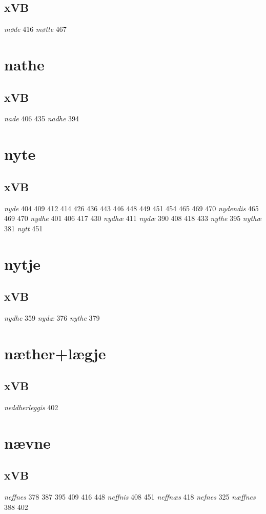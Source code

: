 \documentclass[a4paper,twocolumn]{article}
\begin{document}
\subsection{xVB}
\label{sec:orge35140a}
\emph{møde} 416 \emph{møtte} 467 
\section{nathe}
\label{sec:org85e29d6}
\subsection{xVB}
\label{sec:orga659081}
\emph{nade} 406 435 \emph{nadhe} 394 
\section{nyte}
\label{sec:orgb786a4c}
\subsection{xVB}
\label{sec:org645aca0}
\emph{nyde} 404 409 412 414 426 436 443 446 448 449 451 454 465 469 470 \emph{nydendis} 465 469 470 \emph{nydhe} 401 406 417 430 \emph{nydhæ} 411 \emph{nydæ} 390 408 418 433 \emph{nythe} 395 \emph{nythæ} 381 \emph{nytt} 451 
\section{nytje}
\label{sec:org18272cd}
\subsection{xVB}
\label{sec:org2d49634}
\emph{nydhe} 359 \emph{nydæ} 376 \emph{nythe} 379 
\section{næther+lægje}
\label{sec:orge9523a3}
\subsection{xVB}
\label{sec:org4076268}
\emph{neddherleggis} 402 
\section{nævne}
\label{sec:org8244231}
\subsection{xVB}
\label{sec:orgf5f193f}
\emph{neffnes} 378 387 395 409 416 448 \emph{neffnis} 408 451 \emph{neffnæs} 418 \emph{nefnes} 325 \emph{næffnes} 388 402 
\end{document}
